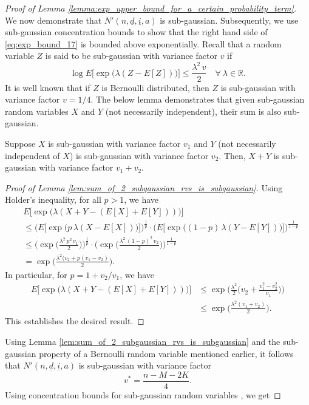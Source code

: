 \begin{proof}[Proof of Lemma \ref{lemma:exp_upper_bound_for_a_certain_probability_term}]
We now demonstrate that $N'(n, \underline{d}, \underline{i}, a)$ is sub-gaussian. Subsequently, we use sub-gaussian concentration bounds to show that the right hand side of \eqref{eq:exp_bound_17} is bounded above exponentially. Recall that a random variable $Z$ is said to be sub-gaussian with variance factor $v$ \cite[Section 2.3]{boucheron2013concentration} if
\begin{equation}
	\log E\bigg[\exp\bigg(\lambda(Z-E[Z])\bigg)\bigg]\leq \frac{\lambda^2\,v}{2}\quad \forall~\lambda\in \mathbb{R}.
\end{equation}
It is well known that if $Z$ is Bernoulli distributed, then $Z$ is sub-gaussian with variance factor $v=1/4$.
The below lemma demonstrates that given sub-gaussian random variables $X$ and $Y$ (not necessarily independent), their sum is also sub-gaussian.
\begin{lemma}
\label{lem:sum_of_2_subgaussian_rvs_is_subgaussian}
	Suppose $X$ is sub-gaussian with variance factor $v_1$ and $Y$ (not necessarily independent of $X$) is sub-gaussian with variance factor $v_2$. Then, $X+Y$ is sub-gaussian with variance factor $v_1+v_2$.
\end{lemma}
\begin{proof}[Proof of Lemma \ref{lem:sum_of_2_subgaussian_rvs_is_subgaussian}]
Using Holder's inequality, for all $p>1$, we have
\begin{align}
	&E\bigg[\exp\bigg(\lambda(X+Y - (E[X]+E[Y]))\bigg)\bigg] \nonumber\\
	&\leq \bigg(E\bigg[\exp\bigg(p\,\lambda (X-E[X])\bigg)\bigg]\bigg)^{\frac{1}{p}}\cdot \bigg(E\bigg[\exp\bigg((1-p)\,\lambda (Y-E[Y])\bigg)\bigg]\bigg)^{\frac{1}{1-p}} \nonumber\\
	&\leq \bigg(\exp\bigg(\frac{\lambda^2\,p^2\,v_1}{2}\bigg)\bigg)^{\frac{1}{p}}\cdot \bigg(\exp\bigg(\frac{\lambda^2\,(1-p)^2\,v_2}{2}\bigg)\bigg)^{\frac{1}{1-p}}\nonumber\\
	&=\exp\bigg(\frac{\lambda^2(v_2+p(v_1-v_2)}{2}\bigg).
	\label{eq:exp_bound_18}
\end{align}
In particular, for $p=1+v_2/v_1$, we have
\begin{align}
	E\bigg[\exp\bigg(\lambda(X+Y - (E[X]+E[Y]))\bigg)\bigg] &\leq \exp\bigg(\frac{\lambda^2}{2}\bigg(v_2+\frac{v_1^2-v_2^2}{v_1}\bigg)\bigg)\nonumber\\
	&\leq \exp\bigg(\frac{\lambda^2(v_1+v_2)}{2}\bigg).
\end{align}
This establishes the desired result.
\end{proof}
Using Lemma \ref{lem:sum_of_2_subgaussian_rvs_is_subgaussian} and the sub-gaussian property of a Bernoulli random variable mentioned earlier, it follows that $N'(n, \underline{d}, \underline{i}, a)$ is sub-gaussian with variance factor $$ v^*=\frac{n-M-2K}{4}. $$ Using concentration bounds for sub-gaussian random variables \cite[p. 25]{boucheron2013concentration}, we get

\end{proof}
